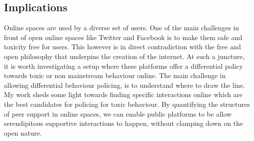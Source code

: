 \subsection{Implications} 
Online spaces are used by a diverse set of users. One of the main challenges in front of open online spaces like Twitter and Facebook is to make them safe and toxicity free for users. 
This however is in direct contradiction with the free and open philosophy that underpins the creation of the internet. At such a juncture, it is worth investigating a setup where these platforms offer a differential policy towards toxic or non mainstream behaviour online. 
The main challenge in allowing differential behaviour policing, is to understand where to draw the line. My work sheds some light towards finding specific interactions online which are the best candidates for policing for toxic behaviour. By quantifying the structures of peer support in online spaces, we can enable public platforms to be allow serendipitous supportive interactions to happen, without clamping down on the open nature.








